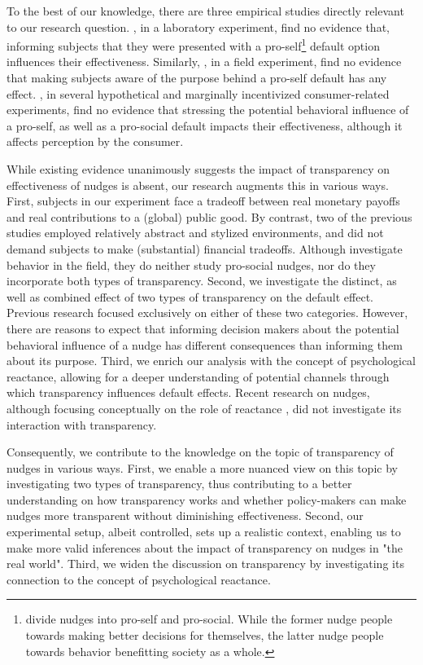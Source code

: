 \documentclass[review, authoryear,12pt]{elsarticle}
\begin{document}
To the best of our knowledge, there are three empirical studies directly relevant to our research question. \cite{Loewenstein.2015}, in a laboratory experiment, find no evidence that, informing subjects that they were presented with a pro-self\footnote{\cite{Hagman.2015} divide nudges into pro-self and pro-social. While the former nudge people towards making better decisions for themselves, the latter nudge people towards behavior benefitting society as a whole.} default option influences their effectiveness. Similarly, \cite{Kroese.2016}, in a field experiment, find no evidence that making subjects aware of the purpose behind a pro-self default has any effect. \cite{Steffel.2016}, in several hypothetical and marginally incentivized consumer-related experiments, find no evidence that stressing the potential behavioral influence of a pro-self, as well as a pro-social default impacts their effectiveness, although it affects perception by the consumer.

While existing evidence unanimously suggests the impact of transparency on effectiveness of nudges is absent, our research augments this in various ways. First, subjects in our experiment face a tradeoff between real monetary payoffs and real contributions to a (global) public good. By contrast, two of the previous studies employed relatively abstract and stylized environments, and did not demand subjects to make (substantial) financial tradeoffs. Although \cite{Kroese.2016} investigate behavior in the field, they do neither study pro-social nudges, nor do they incorporate both types of transparency. Second, we investigate the distinct, as well as combined effect of two types of transparency on the default effect. Previous research focused exclusively on either of these two categories. However, there are reasons to expect that informing decision makers about the potential behavioral influence of a nudge has different consequences than informing them about its purpose. Third, we enrich our analysis with the concept of psychological reactance, allowing for a deeper understanding of potential channels through which transparency influences default effects. Recent research on nudges, although focusing conceptually on the role of reactance \citep{Arad.2015, Hedlin.2016}, did not investigate its interaction with transparency. 

Consequently, we contribute to the knowledge on the topic of transparency of nudges in various ways. First, we enable a more nuanced view on this topic by investigating two types of transparency, thus contributing to a better understanding on how transparency works and whether policy-makers can make nudges more transparent without diminishing effectiveness. Second, our experimental setup, albeit controlled, sets up a realistic context, enabling us to make more valid inferences about the impact of transparency on nudges in "the real world". Third, we widen the discussion on transparency by investigating its connection to the concept of psychological reactance. 
\end{document}
